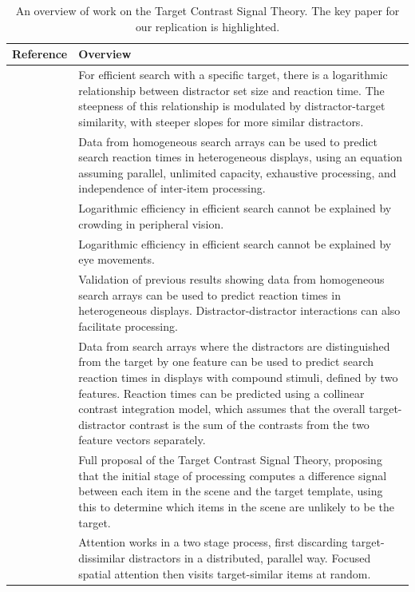 \documentclass[preprint,12pt,authoryear]{elsarticle}
\begin{document}
\begin{table}[hp]
\centering
\begin{tabularx}{\textwidth}{lX}
Reference & Overview\\
 \hline 
\cite{buetti2016towards} & For efficient search with a specific target, there is a logarithmic relationship between distractor set size and reaction time. The steepness of this relationship is modulated by distractor-target similarity, with steeper slopes for more similar distractors.\\
\cite{wang2017predicting} & Data from homogeneous search arrays can be used to predict search reaction times in heterogeneous displays, using an equation assuming parallel, unlimited capacity, exhaustive processing, and independence of inter-item processing. \\ 
\cite{madison2018role} & Logarithmic efficiency in efficient search cannot be explained by crowding in peripheral vision. \\
\cite{ng2018fixed} & Logarithmic efficiency in efficient search cannot be explained by eye movements. \\
\cite{lleras2019predicting} & Validation of previous results showing data from homogeneous search arrays can be used to predict reaction times in heterogeneous displays. Distractor-distractor interactions can also facilitate processing. \\
\textbf{\cite{buetti2019predicting}} & Data from search arrays where the distractors are distinguished from the target by one feature can be used to predict search reaction times in displays with compound stimuli, defined by two features. Reaction times can be predicted using a collinear contrast integration model, which assumes that the overall target-distractor contrast is the sum of the contrasts from the two feature vectors separately. \\
\cite{lleras2020target} & Full proposal of the Target Contrast Signal Theory, proposing that the initial stage of processing computes a difference signal between each item in the scene and the target template, using this to determine which items in the scene are unlikely to be the target. \\
\cite{ng2020prioritization} & Attention works in a two stage process, first discarding target-dissimilar distractors in a distributed, parallel way. Focused spatial attention then visits target-similar items at random. \\
\end{tabularx}
\caption{An overview of work on the Target Contrast Signal Theory. The key paper for our replication is highlighted.}
\label{tab:tcs_overview}
\end{table}
\end{document}
